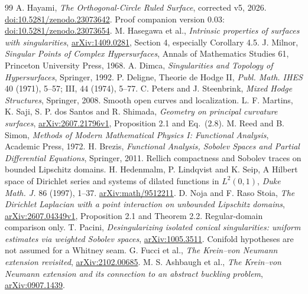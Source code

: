 \documentclass[11pt]{article}
\theoremstyle{readable}
\theoremstyle{remark}\newtheorem{remark}[theorem]{Remark}
\begin{document}
\begin{thebibliography}{99}
 A. Hayami, \emph{The Orthogonal-Circle Ruled Surface}, corrected v5,
2026. \href{https://doi.org/10.5281/zenodo.23073642}{doi:10.5281/zenodo.23073642}.
Proof companion version 0.03:
\href{https://doi.org/10.5281/zenodo.23073654}{doi:10.5281/zenodo.23073654}.
 M. Hasegawa et al., \emph{Intrinsic properties of surfaces
with singularities}, \href{https://arxiv.org/abs/1409.0281}{arXiv:1409.0281},
Section 4, especially Corollary 4.5.
 J. Milnor, \emph{Singular Points of Complex Hypersurfaces},
Annals of Mathematics Studies 61, Princeton University Press, 1968.
 A. Dimca, \emph{Singularities and Topology of Hypersurfaces},
Springer, 1992.
 P. Deligne, Theorie de Hodge II, \emph{Publ. Math. IHES} 40
(1971), 5--57; III, 44 (1974), 5--77.
 C. Peters and J. Steenbrink, \emph{Mixed Hodge Structures},
Springer, 2008. Smooth open curves and localization.
 L. F. Martins, K. Saji, S. P. dos Santos and R. Shimada,
\emph{Geometry on principal curvature surfaces},
\href{https://arxiv.org/abs/2607.21796}{arXiv:2607.21796v1},
Proposition 2.1 and Eq.~(2.8).
 M. Reed and B. Simon, \emph{Methods of Modern Mathematical
Physics I: Functional Analysis}, Academic Press, 1972.
 H. Brezis, \emph{Functional Analysis, Sobolev Spaces and
Partial Differential Equations}, Springer, 2011. Rellich compactness and
Sobolev traces on bounded Lipschitz domains.
 H. Hedenmalm, P. Lindqvist and K. Seip, A Hilbert space of
Dirichlet series and systems of dilated functions in $L^2(0,1)$,
\emph{Duke Math. J.} 86 (1997), 1--37.
\href{https://arxiv.org/abs/math/9512211}{arXiv:math/9512211}.
 D. Noja and F. Raso Stoia, \emph{The Dirichlet Laplacian
with a point interaction on unbounded Lipschitz domains},
\href{https://arxiv.org/abs/2607.04349}{arXiv:2607.04349v1},
Proposition 2.1 and Theorem 2.2. Regular-domain comparison only.
 T. Pacini, \emph{Desingularizing isolated conical singularities:
uniform estimates via weighted Sobolev spaces},
\href{https://arxiv.org/abs/1005.3511}{arXiv:1005.3511}. Conifold hypotheses
are not assumed for a Whitney seam.
 G. Fucci et al., \emph{The Krein--von Neumann extension revisited},
\href{https://arxiv.org/abs/2102.00685}{arXiv:2102.00685}.
 M. S. Ashbaugh et al., \emph{The Krein--von Neumann
extension and its connection to an abstract buckling problem},
\href{https://arxiv.org/abs/0907.1439}{arXiv:0907.1439}.

\end{thebibliography}
\end{document}
